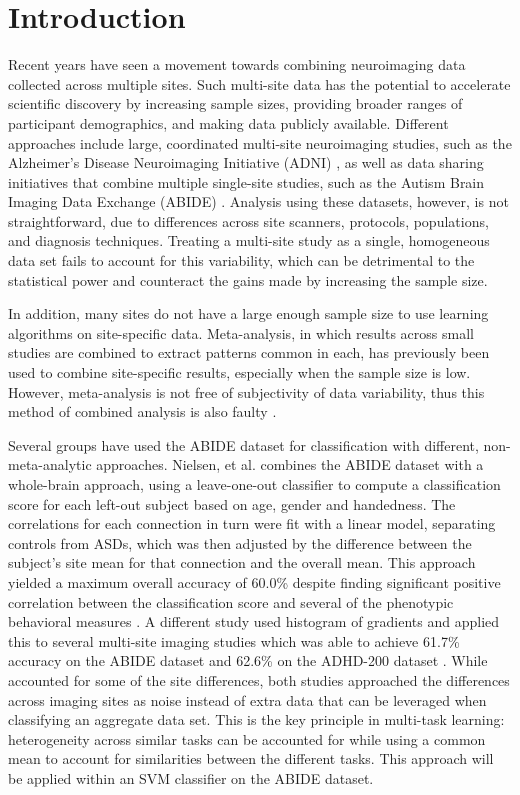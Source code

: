 \documentclass{llncs}
\begin{document}
\section{Introduction}
Recent years have seen a movement towards combining neuroimaging data collected
across multiple sites. Such multi-site data has the potential to accelerate
scientific discovery by increasing sample sizes, providing broader ranges of
participant demographics, and making data publicly available. Different
approaches include large, coordinated multi-site neuroimaging studies, such as the Alzheimer's Disease Neuroimaging Initiative (ADNI) \cite{adni}, as well as
data sharing initiatives that combine multiple single-site studies, such as the
Autism Brain Imaging Data Exchange (ABIDE) \cite{abide}. Analysis using these
datasets, however, is not straightforward, due to differences across site
scanners, protocols, populations, and diagnosis techniques. Treating a
multi-site study as a single, homogeneous data set fails to account for this
variability, which can be detrimental to the statistical power and counteract
the gains made by increasing the sample size.

In addition, many sites do not have a large enough sample size to use learning
algorithms on site-specific data.  Meta-analysis, in which results across small
studies are combined to extract patterns common in each, has previously been
used to combine site-specific results, especially when the sample size is low.
However, meta-analysis is not free of subjectivity of data variability, thus
this method of combined analysis is also faulty \cite{meta}.

Several groups have used the ABIDE dataset for classification with different, non-meta-analytic approaches. Nielsen, et al. combines the ABIDE dataset with a whole-brain approach, using a leave-one-out classifier to compute a classification score for each left-out subject based on age, gender and handedness.  The correlations for each connection in turn were fit with a linear model, separating controls from ASDs, which was then adjusted by the difference between the subject's site mean for that connection and the overall mean.  This approach yielded a maximum overall accuracy of 60.0\% despite finding significant positive correlation between the classification score and several of the phenotypic behavioral measures \cite{Jared}. A different study used histogram of gradients and applied this to several multi-site imaging studies which was able to achieve 61.7\% accuracy on the ABIDE dataset and 62.6\% on the ADHD-200 dataset \cite{ghiassian}. While \cite{Jared} accounted for some of the site differences, both studies approached the differences across imaging sites as noise instead of extra data that can be leveraged when classifying an aggregate data set.
This is the key principle in multi-task learning: heterogeneity across similar tasks can be accounted for while using a common mean to account for similarities between the different tasks.  This approach will be applied within an SVM classifier on the ABIDE dataset.
\end{document}
